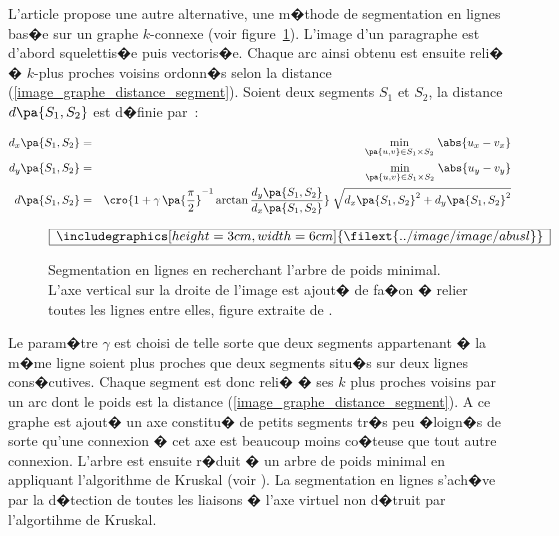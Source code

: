 L'article  propose une autre alternative, une m�thode de segmentation en lignes bas�e sur un graphe $k$-connexe (voir figure~\ref{image_graphe_distance_segment_fig}). L'image d'un paragraphe est d'abord squelettis�e puis vectoris�e. Chaque arc ainsi obtenu est ensuite reli� � $k$-plus proches voisins ordonn�s selon la distance (\ref{image_graphe_distance_segment}). Soient deux segments $S_1$ et $S_2$, la distance $d\pa{S_1,S_2}$ est d�finie par~:


            \begin{eqnarray}
            d_x\pa{S_1,S_2}     &=&        \underset{\pa{u,v} \in S_1 \times S_2} {\min } \; \abs{ u_x - v_x } \nonumber \\
            d_y\pa{S_1,S_2}     &=&        \underset{\pa{u,v} \in S_1 \times S_2} {\min } \; \abs{ u_y - v_y } \nonumber \\
            d\pa{S_1,S_2}            &=&        \cro { 1 + \gamma \, \pa{ \frac{\pi}{2} }^{-1}  \arctan \frac{ d_y\pa{S_1,S_2} } {d_x\pa{S_1,S_2} } }
                                                            \; \sqrt { d_x\pa{S_1,S_2} ^2 + d_y\pa{S_1,S_2} ^ 2} 
                        \label{image_graphe_distance_segment}
            \end{eqnarray}


            \begin{figure}[ht]
        $$\frame{$\begin{array}[c]{c}\includegraphics[height=3cm, width=6cm]
        {\filext{../image/image/abusl}}\end{array}$}$$
        \caption{Segmentation en lignes en recherchant l'arbre de poids minimal. L'axe vertical 
                            sur la droite de l'image est ajout� de fa�on � relier toutes les lignes entre elles, figure 
                            extraite de .}
        \label{image_graphe_distance_segment_fig}
            \end{figure}
            
            
Le param�tre $\gamma$ est choisi de telle sorte que deux segments appartenant � la m�me ligne soient plus proches que deux segments situ�s sur deux lignes cons�cutives. Chaque segment est donc reli� � ses $k$ plus proches voisins par un arc dont le poids est la distance (\ref{image_graphe_distance_segment}). A ce graphe est ajout� un axe constitu� de petits segments tr�s peu �loign�s de sorte qu'une connexion � cet axe est beaucoup moins co�teuse que tout autre connexion. L'arbre est ensuite r�duit � un arbre de poids minimal en appliquant l'algorithme de Kruskal (voir ). La segmentation en lignes s'ach�ve par la d�tection de toutes les liaisons � l'axe virtuel non d�truit par l'algortihme de Kruskal.









